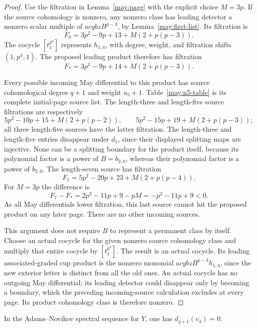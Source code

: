 \begin{proof}
Use the filtration in Lemma~\ref{may:page} with the explicit choice
$M=3p$.  If the source cohomology is nonzero, any nonzero class has
leading detector a nonzero scalar multiple of
$acybz B^{p-3}$, by Lemma~\ref{may:first-list}.  Its filtration is
\[
 F_0=3p^2-9p+13+M(2+p(p-3)).
\]
The cocycle $[t_1^{p^4}]$ represents $h_{1,4}$, with degree, weight, and
filtration shifts $(1,p^4,1)$.  The proposed leading product therefore
has filtration
\begin{equation}
 F_*=3p^2-9p+14+M(2+p(p-3)).
 \label{may:product-filtration}
\end{equation}

Every possible incoming May differential to this product has source
cohomological degree $q+1$ and weight $u_5+1$.
Table~\ref{may:n5-table} is its complete initial-page source list.
The length-three and length-five source filtrations are respectively
\[
 5p^2-10p+15+M(2+p(p-2)),\qquad
 5p^2-15p+19+M(2+p(p-3));
\]
all three length-five sources have the latter filtration.
The length-three and length-five entries disappear under $d_1$, since
their displayed splitting maps are injective.  None can be a splitting
boundary for the product itself, because its polynomial factor is a
power of $B=b_{2,0}$, whereas their polynomial factor is a power of
$b_{3,0}$.  The length-seven source has filtration
\[
 F_7=5p^2-20p+23+M(2+p(p-4)).
\]
For $M=3p$ the difference is
\[
 F_7-F_*=2p^2-11p+9-pM=-p^2-11p+9<0.
\]
As all May differentials lower filtration, this last source cannot hit
the proposed product on any later page.  There are no other incoming
sources.

This argument does not require $B$ to represent a permanent class by
itself.  Choose an actual cocycle for the given nonzero source
cohomology class and multiply that entire cocycle by
$[t_1^{p^4}]$.  The result is an actual cocycle.  Its leading
associated-graded cup product is the nonzero monomial
$acybz B^{p-3}h_{1,4}$, since the new exterior letter is distinct from
all the old ones.  An actual cocycle has no outgoing May differential;
its leading detector could disappear only by becoming a boundary,
which the preceding incoming-source calculation excludes at every
page.  Its product cohomology class is therefore nonzero.
\end{proof}

\begin{proposition}
\label{may:first-differential}
In the Adams--Novikov spectral sequence for $Y$, one has
$d_{q+1}(v_4)=0$.
\end{proposition}

